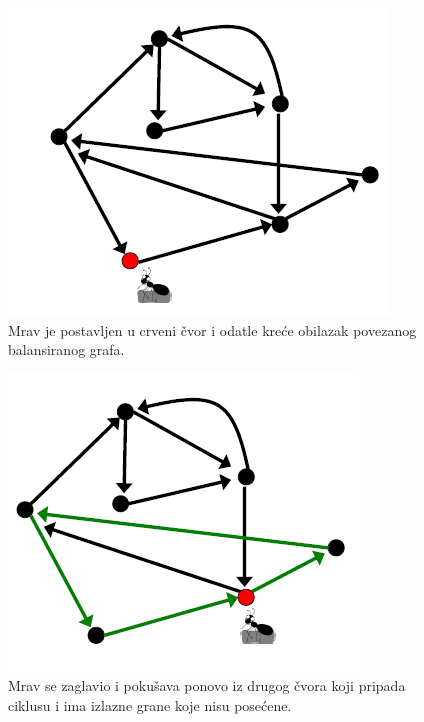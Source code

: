 \noindent
\begin{minipage}{\textwidth}
	\centering
	\begin{minipage}{0.45\textwidth}
		\begin{figure}[H]
			\centering
			\includegraphics[width=\textwidth]{poglavlja/3/slike/mrav1.png}
			\caption{Mrav je postavljen u crveni čvor i odatle kreće obilazak povezanog balansiranog grafa.}
			\label{slika:mrav1}
		\end{figure} 
	\end{minipage}
	\hfill 
	\begin{minipage}{0.45\textwidth}
		\begin{figure}[H]
			\centering
			\includegraphics[width=\textwidth]{poglavlja/3/slike/mrav2.png}
			\caption{Mrav se zaglavio i pokušava ponovo iz drugog čvora koji pripada ciklusu i ima izlazne grane koje nisu posećene.}
			\label{slika:mrav2}
		\end{figure} 
	\end{minipage}
	\vspace*{1em}
\end{minipage}

